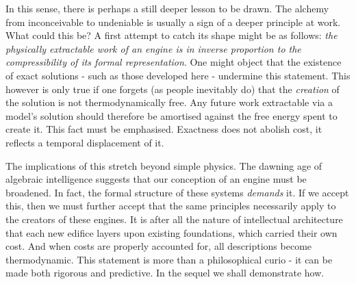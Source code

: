  In this sense, there is perhaps a still deeper lesson to be drawn. The alchemy from inconceivable to undeniable is usually a sign of a deeper principle at work. What could this be? A first attempt to catch its shape might be as follows: \emph{the physically extractable work of an engine is in inverse proportion to the compressibility of its formal representation}. One might object that the existence of exact solutions - such as those developed here - undermine this statement. This however is only true if one forgets (as people inevitably do) that the \emph{creation} of the solution is not thermodynamically free. Any future work extractable via a model's solution should therefore be amortised against the free energy spent to create it. This fact must be emphasised. Exactness does not abolish cost, it reflects a temporal displacement of it.

The implications of this stretch beyond simple physics. The dawning age of algebraic intelligence suggests that our conception of an engine must be broadened. In fact, the formal structure of these systems \emph{demands} it. If we accept this, then we must further accept that the same principles necessarily apply to the creators of these engines. It is after all the nature of intellectual architecture that each new edifice layers upon existing foundations, which carried their own cost. And when costs are properly accounted for, all descriptions become thermodynamic. This statement is more than a philosophical curio - it can be made both rigorous and predictive. In the sequel we shall demonstrate how.     





